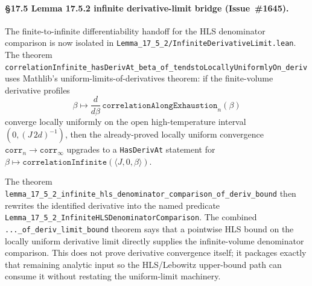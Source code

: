 \documentclass[a4paper,11pt]{article}
\begin{document}
\paragraph{\S17.5 Lemma 17.5.2 infinite derivative-limit bridge
(Issue~\#1645).} The finite-to-infinite differentiability handoff for the
HLS denominator comparison is now isolated in
\texttt{Lemma\_17\_5\_2/InfiniteDerivativeLimit.lean}.  The theorem
\texttt{correlationInfinite\_hasDerivAt\_beta\_of\_tendstoLocallyUniformlyOn\_deriv}
uses Mathlib's uniform-limits-of-derivatives theorem: if the finite-volume
derivative profiles
\[
  \beta \mapsto \frac{d}{d\beta}\,
  \texttt{correlationAlongExhaustion}_{n}(\beta)
\]
converge locally uniformly on the open high-temperature interval
\((0,(J\,2d)^{-1})\), then the already-proved locally uniform convergence
\(\texttt{corr}_{n}\to\texttt{corr}_{\infty}\) upgrades to a
\texttt{HasDerivAt} statement for
\(\beta\mapsto\texttt{correlationInfinite}(\langle J,0,\beta\rangle)\).

The theorem
\texttt{lemma\_17\_5\_2\_infinite\_hls\_denominator\_comparison\_of\_deriv\_bound}
then rewrites the identified derivative into the named predicate
\texttt{Lemma\_17\_5\_2\_InfiniteHLSDenominatorComparison}.  The combined
\texttt{...\_of\_deriv\_limit\_bound} theorem says that a pointwise HLS bound
on the locally uniform derivative limit directly supplies the infinite-volume
denominator comparison.  This does not prove derivative convergence itself;
it packages exactly that remaining analytic input so the HLS/Lebowitz
upper-bound path can consume it without restating the uniform-limit
machinery.
\end{document}
